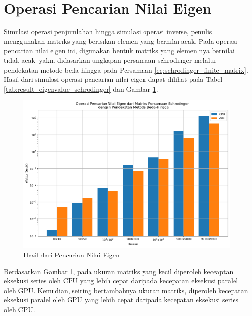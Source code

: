 \section{Operasi Pencarian Nilai Eigen}

Simulasi operasi penjumlahan hingga simulasi operasi inverse, penulis menggunakan matriks yang berisikan elemen yang bernilai acak. Pada operasi pencarian nilai eigen ini, digunakan bentuk matriks yang elemen nya bernilai tidak acak, yakni didasarkan ungkapan persamaan schrodinger melalui pendekatan metode beda-hingga pada Persamaan \ref{eq:schrodinger_finite_matrix}. Hasil dari simulasi operasi pencarian nilai eigen dapat dilihat pada Tabel \ref{tab:result_eigenvalue_schrodinger} dan Gambar \ref{img:result_eigenvalue_schrodinger}.

\begin{figure}[H]
	\centering
	\includegraphics[width=14cm, scale=1]{images/penelitian/eigenvalue-schrodinger.png}
	\caption{Hasil dari Pencarian Nilai Eigen}
	\label{img:result_eigenvalue_schrodinger}
\end{figure}

Berdasarkan Gambar \ref{img:result_eigenvalue_schrodinger}, pada ukuran matriks yang kecil diperoleh keceaptan eksekusi series oleh CPU yang lebih cepat daripada kecepatan eksekusi paralel oleh GPU. Kemudian, seiring bertambahnya ukuran matriks, diperoleh kecepatan eksekusi paralel oleh GPU yang lebih cepat daripada kecepatan eksekusi series oleh CPU.

